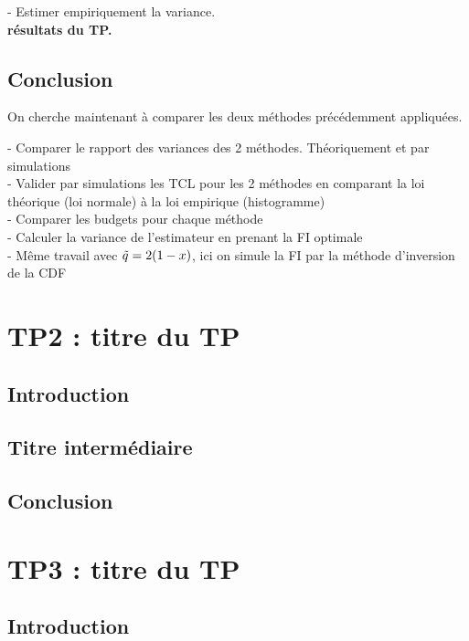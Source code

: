 \documentclass{article}
\begin{document}
- Estimer empiriquement la variance.\\
\textbf{résultats du TP.}

\subsection{Conclusion}
On cherche maintenant à comparer les deux méthodes précédemment appliquées.

- Comparer le rapport des variances des 2 méthodes. Théoriquement et par simulations\\


- Valider par simulations les TCL pour les 2 méthodes en comparant la loi théorique (loi normale) à la loi empirique (histogramme)\\


- Comparer les budgets pour chaque méthode\\


- Calculer la variance de l’estimateur en prenant la FI optimale\\


- Même travail avec $\Tilde{q}=2(1-x)$, ici on simule la FI par la méthode d’inversion de la CDF\\















\newpage
\section{TP2 : titre du TP}
\subsection{Introduction}
\subsection{Titre intermédiaire}
\subsection{Conclusion}

\newpage
\section{TP3 : titre du TP}
\subsection{Introduction}
\end{document}
